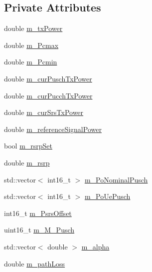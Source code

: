 \subsection*{Private Attributes}
\begin{DoxyCompactItemize}
\item 
double \hyperlink{classns3_1_1LteUePowerControl_a36f256a1ffe0a21f448b58727d0d5bb4}{m\+\_\+tx\+Power}
\item 
double \hyperlink{classns3_1_1LteUePowerControl_a0e0589a67d60c826259cd72149789b59}{m\+\_\+\+Pcmax}
\item 
double \hyperlink{classns3_1_1LteUePowerControl_ae0cff8633e8442bf356f409f303d5003}{m\+\_\+\+Pcmin}
\item 
double \hyperlink{classns3_1_1LteUePowerControl_a9383c506998b50d2d344ee5c59241751}{m\+\_\+cur\+Pusch\+Tx\+Power}
\item 
double \hyperlink{classns3_1_1LteUePowerControl_a47a5024be7f43d0e448355af222ce995}{m\+\_\+cur\+Pucch\+Tx\+Power}
\item 
double \hyperlink{classns3_1_1LteUePowerControl_af211dfe8dbf192390417fc417a4a7de4}{m\+\_\+cur\+Srs\+Tx\+Power}
\item 
double \hyperlink{classns3_1_1LteUePowerControl_a157853a8372f8b6a1057c29eb26fddfb}{m\+\_\+reference\+Signal\+Power}
\item 
bool \hyperlink{classns3_1_1LteUePowerControl_adec0f1f5745bbda32d93b59d29e434fc}{m\+\_\+rsrp\+Set}
\item 
double \hyperlink{classns3_1_1LteUePowerControl_adf6233406b67b64ed3e85f19f22a116f}{m\+\_\+rsrp}
\item 
std\+::vector$<$ int16\+\_\+t $>$ \hyperlink{classns3_1_1LteUePowerControl_a763e8b8bd5f6f05842a7d27213e0da84}{m\+\_\+\+Po\+Nominal\+Pusch}
\item 
std\+::vector$<$ int16\+\_\+t $>$ \hyperlink{classns3_1_1LteUePowerControl_a5c5f2f30f1abc9b2a61868a11cd1d845}{m\+\_\+\+Po\+Ue\+Pusch}
\item 
int16\+\_\+t \hyperlink{classns3_1_1LteUePowerControl_a8f75ff82713c4b2b79c83f9dd43b767f}{m\+\_\+\+Psrs\+Offset}
\item 
uint16\+\_\+t \hyperlink{classns3_1_1LteUePowerControl_acfe063da508079ea6e385bb364528a9a}{m\+\_\+\+M\+\_\+\+Pusch}
\item 
std\+::vector$<$ double $>$ \hyperlink{classns3_1_1LteUePowerControl_a5bd3456b271d3ba3ef126b6b96127c02}{m\+\_\+alpha}
\item 
double \hyperlink{classns3_1_1LteUePowerControl_a6965c2b8a9788ef7ddcace5471553635}{m\+\_\+path\+Loss}

\end{DoxyCompactItemize}
